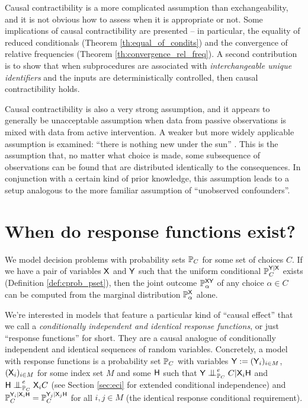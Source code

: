 Causal contractibility is a more complicated assumption than exchangeability, and it is not obvious how to assess when it is appropriate or not. Some implications of causal contractibility are presented -- in particular, the equality of reduced conditionals (Theorem \ref{th:equal_of_condits}) and the convergence of relative frequencies (Theorem \ref{th:convergence_rel_freq}). A second contribution is to show that when subprocedures are associated with \emph{interchangeable unique identifiers} and the inputs are deterministically controlled, then causal contractibility holds.

Causal contractibility is also a very strong assumption, and it appears to generally be unacceptable assumption when data from passive observations is mixed with data from active intervention. A weaker but more widely applicable assumption is examined: ``there is nothing new under the sun'' . This is the assumption that, no matter what choice is made, some subsequence of observations can be found that are distributed identically to the consequences. In conjunction with a certain kind of prior knowledge, this assumption leads to a setup analogous to the more familiar assumption of ``unobserved confounders''.

\begin{theorem}\label{th:convergence_rel_freq}

\end{theorem}

\section{When do response functions exist?}\label{sec:response_functions}

We model decision problems with probability sets $\mathbb{P}_C$ for some set of choices $C$. If we have a pair of variables $\mathsf{X}$ and $\mathsf{Y}$ such that the uniform conditional $\mathbb{P}_C^{\mathsf{Y}|\mathsf{X}}$ exists (Definition \ref{def:cprob_pset}), then the joint outcome $\mathbb{P}_\alpha^{\mathsf{XY}}$ of any choice $\alpha\in C$ can be computed from the marginal distribution $\mathbb{P}_\alpha^{\mathsf{X}}$ alone.

We're interested in models that feature a particular kind of ``causal effect'' that we call a \emph{conditionally independent and identical response functions}, or just ``response functions'' for short. They are a causal analogue of conditionally independent and identical sequences of random variables. Concretely, a model with response functions is a probability set $\mathbb{P}_C$ with variables $\mathsf{Y}:=(\mathsf{Y}_i)_{i\in M}$, $(\mathsf{X}_i)_{i\in M}$ for some index set $M$ and some $\mathsf{H}$ such that $\RV{Y} \CI_{\prob{P}_C}^e C|\RV{X}_i\RV{H}$ and $\RV{H}\CI_{\prob{P}_C}^e \RV{X}_i C$ (see Section \ref{sec:eci} for extended conditional independence) and $\mathbb{P}_C^{\mathsf{Y}_i|\mathsf{X}_i\mathsf{H}}=\mathbb{P}_C^{\mathsf{Y}_j|\mathsf{X}_j\mathsf{H}}$ for all $i,j\in M$ (the identical response conditional requirement).

